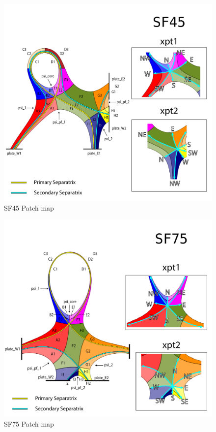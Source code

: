 \begin{figure}[H]
    \centering
        \includegraphics[width=1.05\textwidth]{figures/configurations/SF45_collection.pdf}
        \caption{SF45 Patch map}
        \label{fig:sf45_patch_map}
\end{figure}
\begin{figure}[H]
    \centering
        \includegraphics[width=\textwidth]{figures/configurations/SF75_collection.pdf}
        \caption{SF75 Patch map}
        \label{fig:sf75_patch_map}
\end{figure}
